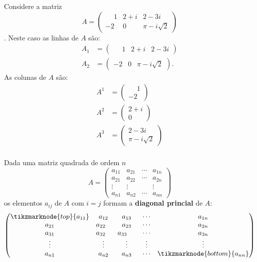 \begin{exemplo}
	Considere a matriz
	\[
		A = \begin{pmatrix}
			\phantom{-} 1 & 2 + i & 2 - 3i\\
			-2 & 0 & \pi - i\sqrt{2}
		\end{pmatrix}
	\].
	Neste caso as linhas de $A$ são:
	\begin{align*}
		A_1 &= \begin{pmatrix}\phantom{-} 1 & 2 + i & 2 - 3i\end{pmatrix}\\
		A_2 &= \begin{pmatrix}-2 & 0 & \pi - i\sqrt{2}\end{pmatrix}.
	\end{align*}
	As colunas de $A$ são:
	\begin{align*}
		A^1 &= \begin{pmatrix}
			\phantom{-} 1\\-2
			\end{pmatrix}\\
		A^2 &= \begin{pmatrix}
			2 + i\\0
			\end{pmatrix}\\
		A^3 &= \begin{pmatrix}
			2 - 3i\\\pi - i\sqrt{2}
			\end{pmatrix}\\
	\end{align*}
\end{exemplo}

Dada uma matriz quadrada de ordem $n$
\[
	A = \begin{pmatrix}
		a_{11} & a_{21} & \cdots & a_{1n}\\
		a_{21} & a_{22} & \cdots & a_{2n}\\
		\vdots & \vdots & & \vdots\\
		a_{n1} & a_{n2} & \cdots & a_{nn}
	\end{pmatrix}
\]
os elementos $a_{ij}$ de $A$ com $i = j$ formam a \textbf{diagonal princial} de $A$:
\[
	\begin{pmatrix}
		\tikzmarknode{top}{a_{11}} & a_{12} & a_{13} & \cdots  & a_{1n}\\
		a_{21} & a_{22} \phantom{-} & a_{23} & \cdots  & a_{2n}\\
		a_{31} & a_{32}\phantom{-} & a_{33} \phantom{-1} & \cdots  & a_{3n}\\
		\vdots  & \vdots   & \vdots  & \vdots  & \vdots\\
		a_{n1} & a_{n2} & a_{n3} & \cdots  & \tikzmarknode{bottom}{a_{nn}}\\
	\end{pmatrix}
\]

